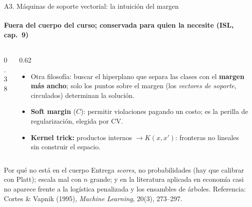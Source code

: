 \documentclass{beamer}
\newcommand{\1}{\mathbb{I}}
\begin{document}
\begin{frame}{A3. Máquinas de soporte vectorial: la intuición del margen}
\framesubtitle{Fuera del cuerpo del curso; conservada para quien la necesite (ISL, cap.\ 9)}
\small
\begin{columns}[T]
\begin{column}{0.38\textwidth}
\begin{center}
\end{center}
\end{column}
\begin{column}{0.62\textwidth}
\vspace{0.05cm}
\begin{itemize}\itemsep3pt
  \item Otra filosofía: buscar el hiperplano que separa las clases con el \textbf{margen más ancho}; solo los puntos sobre el margen (los \emph{vectores de soporte}, circulados) determinan la solución.
  \item \textbf{Soft margin} ($C$): permitir violaciones pagando un costo; es la perilla de regularización, elegida por CV.
  \item \textbf{Kernel trick:} productos internos $\to K(x, x')$: fronteras no lineales sin construir el espacio.
\end{itemize}
\end{column}
\end{columns}
\pause
\vspace{0.1cm}
\begin{block}{Por qué no está en el cuerpo}
Entrega \emph{scores}, no probabilidades (hay que calibrar con Platt); escala mal con $n$ grande; y en la literatura aplicada en economía casi no aparece frente a la logística penalizada y los ensambles de árboles. Referencia: Cortes \& Vapnik (1995), \emph{Machine Learning}, 20(3), 273--297.
\end{block}
\end{frame}
\end{document}
